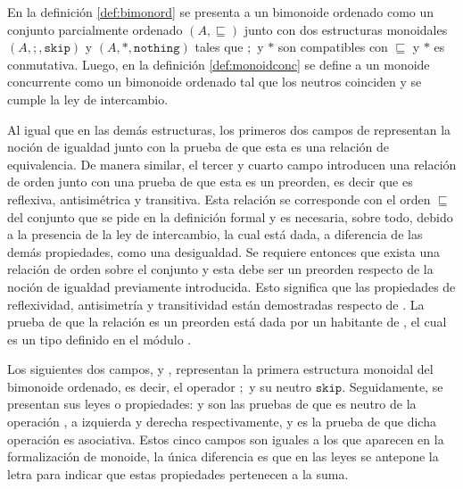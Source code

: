
En la definición \ref{def:bimonord} se presenta a un bimonoide ordenado como un conjunto parcialmente ordenado $(A,\sqsubseteq)$ junto con dos estructuras monoidales $(A,;,\mathtt{skip})$ y $(A,*,\mathtt{nothing})$ tales que $;$ y $*$ son compatibles con $\sqsubseteq$ y $*$ es conmutativa. Luego, en la definición \ref{def:monoidconc} se define a un monoide concurrente como un bimonoide ordenado tal que los neutros coinciden y se cumple la ley de intercambio.

Al igual que en las demás estructuras, los primeros dos campos de  representan la noción de igualdad junto con la prueba de que esta es una relación de equivalencia. De manera similar, el tercer y cuarto campo introducen una relación de orden junto con una prueba de que esta es un preorden, es decir que es reflexiva, antisimétrica y transitiva. Esta relación se corresponde con el orden $\sqsubseteq$ del conjunto que se pide en la definición formal y es necesaria, sobre todo, debido a la presencia de la ley de intercambio, la cual está dada, a diferencia de las demás propiedades, como una desigualdad. Se requiere entonces que exista una relación de orden sobre el conjunto  y esta debe ser un preorden respecto de la noción de igualdad previamente introducida. Esto significa que las propiedades de reflexividad, antisimetría y transitividad están demostradas respecto de . La prueba  de que la relación  es un preorden está dada por un habitante de , el cual es un tipo  definido en el módulo \href{https://agda.github.io/agda-stdlib/Relation.Binary.Structures.html}{}.

Los siguientes dos campos,  y , representan la primera estructura monoidal del bimonoide ordenado, es decir, el operador $;$ y su neutro $\mathtt{skip}$. Seguidamente, se presentan sus leyes o propiedades:  y  son las pruebas de que  es neutro de la operación , a izquierda y derecha respectivamente, y  es la prueba de que dicha operación es asociativa. Estos cinco campos son iguales a los que aparecen en la formalización de monoide, la única diferencia es que en las leyes se antepone la letra  para indicar que estas propiedades pertenecen a la suma. 

